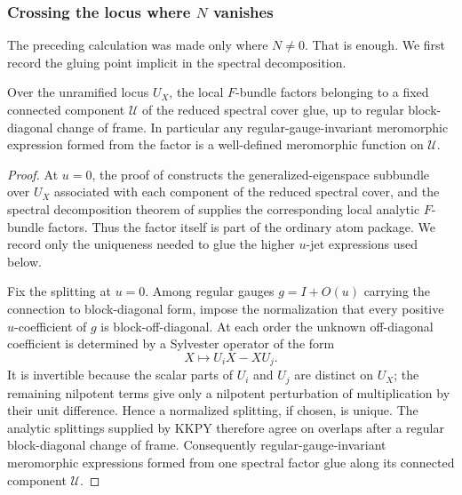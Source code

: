 \subsubsection{Crossing the locus where \texorpdfstring{$N$}{N} vanishes}

The preceding calculation was made only where $N\ne0$.  That is enough.  We
first record the gluing point implicit in the spectral decomposition.

\begin{lemma}\label{lem:factor-glue}
%
%
%
Over the unramified locus $U_X$, the local $F$-bundle factors belonging to a
fixed connected component $\mathcal U$ of the reduced spectral cover glue,
up to regular block-diagonal change of frame.  In particular any
regular-gauge-invariant meromorphic expression formed from the factor is a
well-defined meromorphic function on $\mathcal U$.
\end{lemma}

\begin{proof}
At $u=0$, the proof of \cite[Proposition~5.23]{KKPYY} constructs the
generalized-eigenspace subbundle over $U_X$ associated with each component
of the reduced spectral cover, and the spectral decomposition theorem of
\cite{KKPYY} supplies the corresponding local analytic $F$-bundle factors.
Thus the factor itself is part of the ordinary atom package.  We record only
the uniqueness needed to glue the higher $u$-jet expressions used below.

Fix the splitting at $u=0$.  Among regular gauges $g=I+O(u)$ carrying the
connection to block-diagonal form, impose the normalization that every
positive $u$-coefficient of $g$ is block-off-diagonal.  At each order the
unknown off-diagonal coefficient is determined by a Sylvester operator of
the form
\[
 X\longmapsto U_iX-XU_j.
\]
It is invertible because the scalar parts of $U_i$ and $U_j$ are distinct on
$U_X$; the remaining nilpotent terms give only a nilpotent perturbation of
multiplication by their unit difference.  Hence a normalized splitting, if
chosen, is unique.  The analytic splittings supplied by KKPY therefore agree
on overlaps after a regular block-diagonal change of frame.  Consequently
regular-gauge-invariant meromorphic expressions formed from one spectral
factor glue along its connected component $\mathcal U$.
\end{proof}

